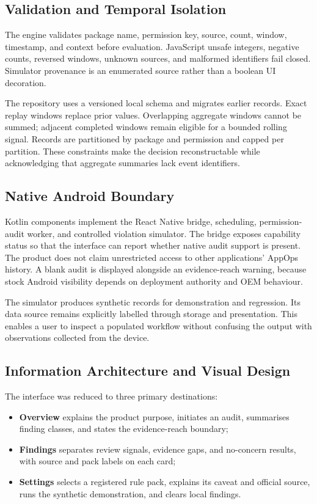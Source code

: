 \subsection{Validation and Temporal Isolation}

The engine validates package name, permission key, source, count, window, timestamp, and context before evaluation. JavaScript unsafe integers, negative counts, reversed windows, unknown sources, and malformed identifiers fail closed. Simulator provenance is an enumerated source rather than a boolean UI decoration.

The repository uses a versioned local schema and migrates earlier records. Exact replay windows replace prior values. Overlapping aggregate windows cannot be summed; adjacent completed windows remain eligible for a bounded rolling signal. Records are partitioned by package and permission and capped per partition. These constraints make the decision reconstructable while acknowledging that aggregate summaries lack event identifiers.

\subsection{Native Android Boundary}

Kotlin components implement the React Native bridge, scheduling, permission-audit worker, and controlled violation simulator. The bridge exposes capability status so that the interface can report whether native audit support is present. The product does not claim unrestricted access to other applications' AppOps history. A blank audit is displayed alongside an evidence-reach warning, because stock Android visibility depends on deployment authority and OEM behaviour.

The simulator produces synthetic records for demonstration and regression. Its data source remains explicitly labelled through storage and presentation. This enables a user to inspect a populated workflow without confusing the output with observations collected from the device.

\subsection{Information Architecture and Visual Design}

The interface was reduced to three primary destinations:

\begin{itemize}
    \item \textbf{Overview} explains the product purpose, initiates an audit, summarises finding classes, and states the evidence-reach boundary;
    \item \textbf{Findings} separates review signals, evidence gaps, and no-concern results, with source and pack labels on each card;
    \item \textbf{Settings} selects a registered rule pack, explains its caveat and official source, runs the synthetic demonstration, and clears local findings.
\end{itemize}

